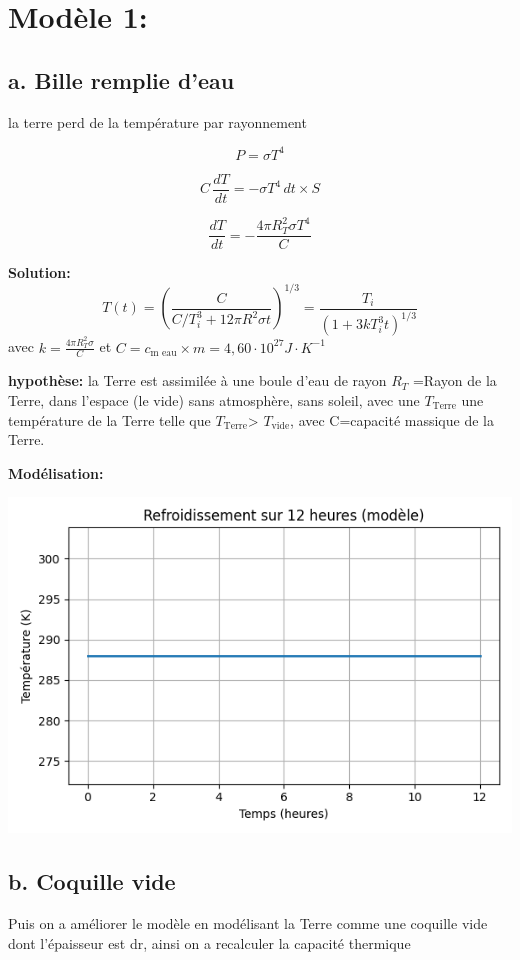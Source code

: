 \documentclass[a4paper,12pt]{article}
\begin{document}
\section{Modèle 1:}
\subsection{a. Bille remplie d'eau}

la terre perd de la température par rayonnement 

\[   P= \sigma T^4 
\]

\[    C \, \frac{dT}{dt} = - \sigma T^4 \, dt \times S
\]

\[\frac{dT}{dt} = - \frac{4 \pi R_T^2 \sigma T^4}{C}\]  

\textbf{Solution:} 
\[
T(t) = \left( \frac{C}{C/T_i^3 + 12\pi R^2 \sigma t} \right)^{1/3} 
= \frac{T_i}{\left(1 + 3k T_i^3 t \right)^{1/3}}
\]
avec \(k=\frac{4\pi R_T^2 \sigma}{C}\)
et \(C=c_{\text{m eau}}\times m=4,60 \cdot 10^{27} J\cdot K^{-1}\)

\bigskip

\textbf{hypothèse:} la Terre est assimilée à une boule d'eau de rayon \(R_{T}\) =Rayon de la Terre,  dans l'espace (le vide) sans atmosphère, sans soleil, avec une \(T_{\text{Terre}}\) une température de la Terre telle que  \(T_{\text{Terre}}\)> \(T_{\text{vide}}\), avec C=capacité massique de la Terre. 

\bigskip
\textbf{Modélisation:} 
    
    \includegraphics[width=0.8\linewidth]{../figures/modele1.png}
\\
\subsection{b. Coquille vide }
Puis on a améliorer le modèle en modélisant la Terre comme une coquille vide dont l'épaisseur est dr, ainsi on a recalculer la capacité thermique  \\
\end{document}
